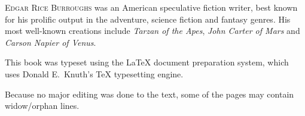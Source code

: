 \cleartorecto
\backmatter

\thispagestyle{empty}
\label{ch:author}
\begin{ChapterStart}
\vspace*{4\nbs}
\end{ChapterStart}

\textsc{Edgar Rice Burroughs} was an American speculative fiction writer, best known for his prolific output in the adventure, science fiction and fantasy genres. His most well-known creations include \emph{Tarzan of the Apes}, \emph{John Carter of Mars} and \emph{Carson Napier of Venus}.


\cleartorecto

\thispagestyle{empty}
\null\vfill
\begin{adjustwidth}{3em}{3em}
This book was typeset using the \LaTeX{} document preparation system, which uses Donald E.~Knuth’s \TeX{} typesetting engine.

\null

\noindent Because no major editing was done to the text, some of the pages may contain widow/orphan lines.
\end{adjustwidth}

\vfill{}

\cleartoend